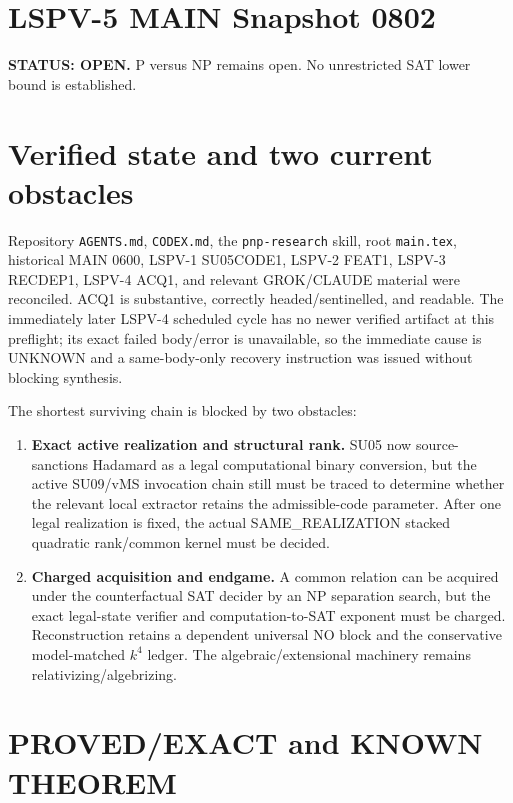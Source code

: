 \documentclass[11pt]{article}
\begin{document}
\section*{LSPV-5 MAIN Snapshot 0802}
\textbf{STATUS: OPEN.} P versus NP remains open. No unrestricted SAT lower bound is established.

\section*{Verified state and two current obstacles}
Repository \texttt{AGENTS.md}, \texttt{CODEX.md}, the \texttt{pnp-research} skill, root \texttt{main.tex}, historical MAIN 0600, LSPV-1 SU05CODE1, LSPV-2 FEAT1, LSPV-3 RECDEP1, LSPV-4 ACQ1, and relevant GROK/CLAUDE material were reconciled. ACQ1 is substantive, correctly headed/sentinelled, and readable. The immediately later LSPV-4 scheduled cycle has no newer verified artifact at this preflight; its exact failed body/error is unavailable, so the immediate cause is UNKNOWN and a same-body-only recovery instruction was issued without blocking synthesis.

The shortest surviving chain is blocked by two obstacles:
\begin{enumerate}
\item \textbf{Exact active realization and structural rank.} SU05 now source-sanctions Hadamard as a legal computational binary conversion, but the active SU09/vMS invocation chain still must be traced to determine whether the relevant local extractor retains the admissible-code parameter. After one legal realization is fixed, the actual SAME\_REALIZATION stacked quadratic rank/common kernel must be decided.
\item \textbf{Charged acquisition and endgame.} A common relation can be acquired under the counterfactual SAT decider by an NP separation search, but the exact legal-state verifier and computation-to-SAT exponent must be charged. Reconstruction retains a dependent universal NO block and the conservative model-matched \(k^4\) ledger. The algebraic/extensional machinery remains relativizing/algebrizing.
\end{enumerate}

\section*{PROVED/EXACT and KNOWN THEOREM}
\end{document}
